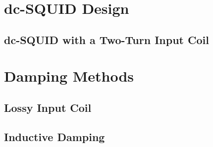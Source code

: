 \section{dc-SQUID Design} \label{sec_SQUIDdesign}

\subsection{dc-SQUID with a Two-Turn Input Coil}


\section{Damping Methods} \label{sec_damping}

\subsection{Lossy Input Coil}

\subsection{Inductive Damping}